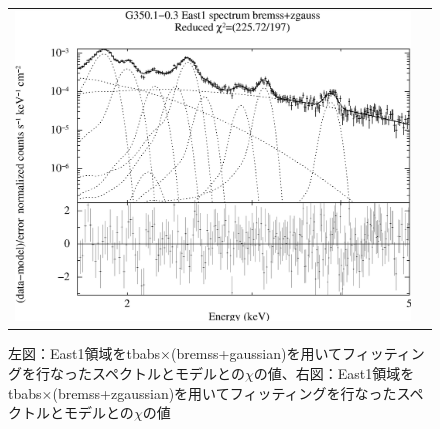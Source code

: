 \documentclass[a4j]{jarticle}%
\begin{document}
\begin{figure}[H]
\begin{center}
\begin{tabular}{cc}
\begin{minipage}{0.5\hsize}
\begin{center}
\includegraphics[scale=0.30]{./ps/East1_bremss+zgaussian.eps}
\end{center}
\end{minipage}
\end{tabular}
\caption{左図：East1領域をtbabs$\times$(bremss+gaussian)を用いてフィッティングを行なったスペクトルとモデルとの$\chi$の値、右図：East1領域をtbabs$\times$(bremss+zgaussian)を用いてフィッティングを行なったスペクトルとモデルとの$\chi$の値}
\label{fig:brem_East2}
\end{center}
\end{figure}
\end{document}
